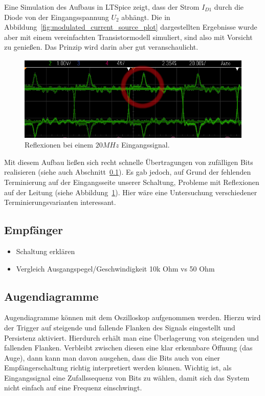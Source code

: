\documentclass[12pt,a4paper]{article}
\begin{document}
Eine Simulation des Aufbaus in LTSpice zeigt, dass der Strom $I_{D1}$ durch die Diode von der Eingangsspannung $U_2$ abhängt. Die in Abbildung~\ref{fig:modulated_current_source_plot} dargestellten Ergebnisse wurde aber mit einem vereinfachten Transistormodell simuliert, sind also mit Vorsicht zu genießen. Das Prinzip wird darin aber gut veranschaulicht.

\begin{figure}[h!]
  \centering
    \includegraphics[width=1.0\textwidth]{img/ring_20MHz.png}
  \caption{Reflexionen bei einem $20MHz$ Eingangssignal.}
  \label{fig:ring_20mhz}
\end{figure}

Mit diesem Aufbau ließen sich recht schnelle Übertragungen von zufälligen Bits realisieren (siehe auch Abschnitt~\ref{sec:direct_rx}). Es gab jedoch, auf Grund der fehlenden Terminierung auf der Eingangsseite unserer Schaltung, Probleme mit Reflexionen auf der Leitung (siehe Abbildung~\ref{fig:ring_20mhz}). Hier wäre eine Untersuchung verschiedener Terminierungsvarianten interessant.

\subsection{Empfänger}
\label{sec:direct_rx}




\begin{itemize}
\item Schaltung erklären
\item Vergleich Ausgangspegel/Geschwindigkeit 10k Ohm vs 50 Ohm
\end{itemize}

\subsection{Augendiagramme}
Augendiagramme können mit dem Oszilloskop aufgenommen werden. Hierzu wird der Trigger auf steigende und fallende Flanken des Signals eingestellt und Persistenz aktiviert. Hierdurch erhält man eine Überlagerung von steigenden und fallenden Flanken. Verbleibt zwischen diesen eine klar erkennbare Öffnung (das Auge), dann kann man davon ausgehen, dass die Bits auch von einer Empfängerschaltung richtig interpretiert werden können. Wichtig ist, als Eingangssignal eine Zufallssequenz von Bits zu wählen, damit sich das System nicht einfach auf eine Frequenz einschwingt.
\end{document}
